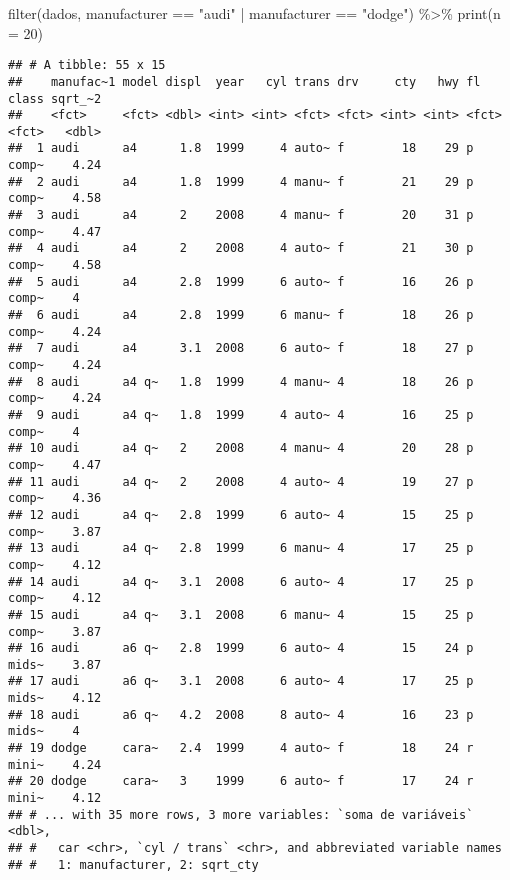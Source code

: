\documentclass[
]{book}
\newenvironment{Shaded}{\begin{snugshade}}{\end{snugshade}}
\newcommand{\AttributeTok}[1]{\textcolor[rgb]{0.77,0.63,0.00}{#1}}
\newcommand{\DecValTok}[1]{\textcolor[rgb]{0.00,0.00,0.81}{#1}}
\newcommand{\FunctionTok}[1]{\textcolor[rgb]{0.00,0.00,0.00}{#1}}
\newcommand{\NormalTok}[1]{#1}
\newcommand{\SpecialCharTok}[1]{\textcolor[rgb]{0.00,0.00,0.00}{#1}}
\newcommand{\StringTok}[1]{\textcolor[rgb]{0.31,0.60,0.02}{#1}}
\begin{document}
\begin{Shaded}
\begin{Highlighting}[]
\FunctionTok{filter}\NormalTok{(dados, manufacturer }\SpecialCharTok{==} \StringTok{"audi"} \SpecialCharTok{|}\NormalTok{ manufacturer }\SpecialCharTok{==} \StringTok{"dodge"}\NormalTok{) }\SpecialCharTok{\%\textgreater{}\%}
  \FunctionTok{print}\NormalTok{(}\AttributeTok{n =} \DecValTok{20}\NormalTok{)}
\end{Highlighting}
\end{Shaded}

\begin{verbatim}
## # A tibble: 55 x 15
##    manufac~1 model displ  year   cyl trans drv     cty   hwy fl    class sqrt_~2
##    <fct>     <fct> <dbl> <int> <int> <fct> <fct> <int> <int> <fct> <fct>   <dbl>
##  1 audi      a4      1.8  1999     4 auto~ f        18    29 p     comp~    4.24
##  2 audi      a4      1.8  1999     4 manu~ f        21    29 p     comp~    4.58
##  3 audi      a4      2    2008     4 manu~ f        20    31 p     comp~    4.47
##  4 audi      a4      2    2008     4 auto~ f        21    30 p     comp~    4.58
##  5 audi      a4      2.8  1999     6 auto~ f        16    26 p     comp~    4   
##  6 audi      a4      2.8  1999     6 manu~ f        18    26 p     comp~    4.24
##  7 audi      a4      3.1  2008     6 auto~ f        18    27 p     comp~    4.24
##  8 audi      a4 q~   1.8  1999     4 manu~ 4        18    26 p     comp~    4.24
##  9 audi      a4 q~   1.8  1999     4 auto~ 4        16    25 p     comp~    4   
## 10 audi      a4 q~   2    2008     4 manu~ 4        20    28 p     comp~    4.47
## 11 audi      a4 q~   2    2008     4 auto~ 4        19    27 p     comp~    4.36
## 12 audi      a4 q~   2.8  1999     6 auto~ 4        15    25 p     comp~    3.87
## 13 audi      a4 q~   2.8  1999     6 manu~ 4        17    25 p     comp~    4.12
## 14 audi      a4 q~   3.1  2008     6 auto~ 4        17    25 p     comp~    4.12
## 15 audi      a4 q~   3.1  2008     6 manu~ 4        15    25 p     comp~    3.87
## 16 audi      a6 q~   2.8  1999     6 auto~ 4        15    24 p     mids~    3.87
## 17 audi      a6 q~   3.1  2008     6 auto~ 4        17    25 p     mids~    4.12
## 18 audi      a6 q~   4.2  2008     8 auto~ 4        16    23 p     mids~    4   
## 19 dodge     cara~   2.4  1999     4 auto~ f        18    24 r     mini~    4.24
## 20 dodge     cara~   3    1999     6 auto~ f        17    24 r     mini~    4.12
## # ... with 35 more rows, 3 more variables: `soma de variáveis` <dbl>,
## #   car <chr>, `cyl / trans` <chr>, and abbreviated variable names
## #   1: manufacturer, 2: sqrt_cty
\end{verbatim}
\end{document}
